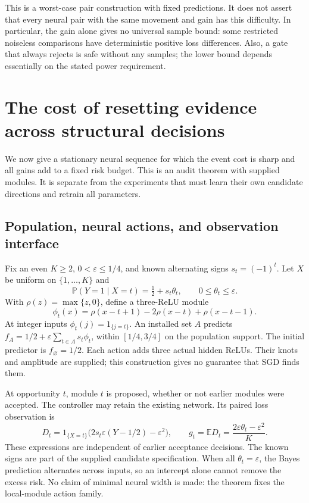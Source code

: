 This is a worst-case pair construction with fixed predictions. It does not
assert that every neural pair with the same movement and gain has this
difficulty. In particular, the gain alone gives no universal sample bound:
some restricted noiseless comparisons have deterministic positive loss
differences. Also, a gate that always rejects is safe without any samples;
the lower bound depends essentially on the stated power requirement.

\section{The cost of resetting evidence across structural decisions}
\label{sec:reset-theory}

We now give a stationary neural sequence for which the event cost is
sharp and all gains add to a fixed risk budget. This is an audit theorem
with supplied modules. It is separate from the experiments that must learn
their own candidate directions and retrain all parameters.

\subsection{Population, neural actions, and observation interface}

Fix an even $K\ge2$, $0<\varepsilon\le1/4$, and known alternating signs
$s_t=(-1)^t$. Let $X$ be uniform on $\{1,\ldots,K\}$ and
\begin{equation}
 \mathbb P(Y=1\mid X=t)=\tfrac12+s_t\theta_t,
 \qquad 0\le\theta_t\le\varepsilon.
 \label{eq:module-law}
\end{equation}
With $\rho(z)=\max\{z,0\}$, define a three-ReLU module
\begin{equation}
 \phi_t(x)=\rho(x-t+1)-2\rho(x-t)+\rho(x-t-1).
 \label{eq:relu-module}
\end{equation}
At integer inputs $\phi_t(j)=1_{\{j=t\}}$.
An installed set $A$ predicts
$f_A=1/2+\varepsilon\sum_{t\in A}s_t\phi_t$, within $[1/4,3/4]$ on the
population support. The initial predictor is $f_\varnothing=1/2$.
Each action adds three actual hidden ReLUs. Their knots and amplitude
are supplied; this construction gives no guarantee that SGD finds them.

At opportunity $t$, module $t$ is proposed, whether or not earlier modules
were accepted. The controller may retain the existing network. Its paired
loss observation is
\begin{equation}
 D_t=1_{\{X=t\}}\bigl(2s_t\varepsilon(Y-1/2)-\varepsilon^2\bigr),
 \qquad g_t=\mathbb ED_t
   =\frac{2\varepsilon\theta_t-\varepsilon^2}{K}.
 \label{eq:module-difference}
\end{equation}
These expressions are independent of earlier acceptance decisions.
The known signs are part of the supplied candidate specification. When all
$\theta_t=\varepsilon$, the Bayes prediction alternates across inputs, so
an intercept alone cannot remove the excess risk. No claim of minimal
neural width is made: the theorem fixes the local-module action family.

